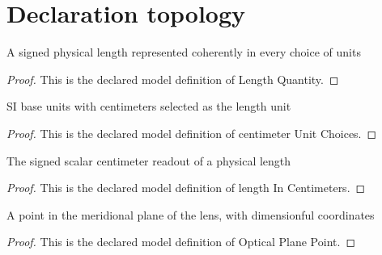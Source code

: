 \section{Declaration topology}
\begin{definition}
  \label{def:physics:phyx-mini-0115:phyxminiproblems-problemphyxmini0115-lengthquantity}
  A signed physical length represented coherently in every choice of units
\end{definition}
\begin{proof}
  This is the declared model definition of Length Quantity.
\end{proof}
\begin{definition}
  \label{def:physics:phyx-mini-0115:phyxminiproblems-problemphyxmini0115-centimeterunitchoices}
  SI base units with centimeters selected as the length unit
\end{definition}
\begin{proof}
  This is the declared model definition of centimeter Unit Choices.
\end{proof}
\begin{definition}
  \label{def:physics:phyx-mini-0115:phyxminiproblems-problemphyxmini0115-lengthincentimeters}
  The signed scalar centimeter readout of a physical length
\end{definition}
\begin{proof}
  This is the declared model definition of length In Centimeters.
\end{proof}
\begin{definition}
  \label{def:physics:phyx-mini-0115:phyxminiproblems-problemphyxmini0115-opticalplanepoint}
  A point in the meridional plane of the lens, with dimensionful coordinates
\end{definition}
\begin{proof}
  This is the declared model definition of Optical Plane Point.
\end{proof}
